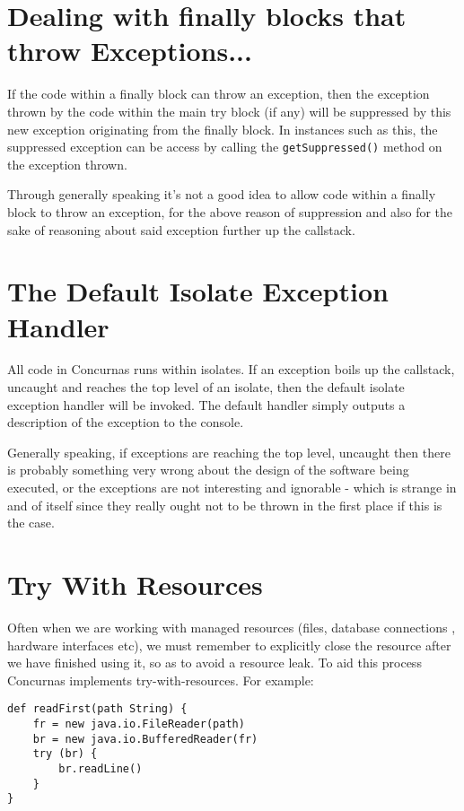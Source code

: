 \documentclass[conc-doc]{subfiles}
\begin{document}
\section{Dealing with finally blocks that throw Exceptions...}
If the code within a finally block can throw an exception, then the exception thrown by the code within the main try block (if any) will be suppressed by this new exception originating from the finally block. In instances such as this, the suppressed exception can be access by calling the \lstinline{getSuppressed()} method on the exception thrown.

Through generally speaking it's not a good idea to allow code within a finally block to throw an exception, for the above reason of suppression and also for the sake of reasoning about said exception further up the callstack.

\section{The Default Isolate Exception Handler}
All code in Concurnas runs within isolates. If an exception boils up the callstack, uncaught and reaches the top level of an isolate, then the default isolate exception handler will be invoked. The default handler simply outputs a description of the exception to the console.






Generally speaking, if exceptions are reaching the top level, uncaught then there is probably something very wrong about the design of the software being executed, or the exceptions are not interesting and ignorable - which is strange in and of itself since they really ought not to be thrown in the first place if this is the case.

\section{Try With Resources}
Often when we are working with managed resources (files, database connections , hardware interfaces etc), we must remember to explicitly close the resource after we have finished using it, so as to avoid a resource leak. To aid this process Concurnas implements try-with-resources. For example:
\begin{lstlisting}
def readFirst(path String) {
	fr = new java.io.FileReader(path)
	br = new java.io.BufferedReader(fr)
	try (br) {
		br.readLine()
	}
}
\end{lstlisting}
\end{document}
